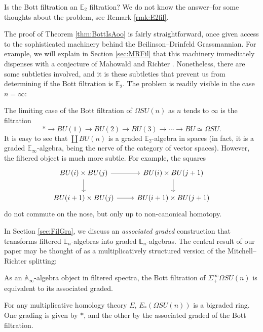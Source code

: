 \begin{qst} \label{qst:BottE2}
Is the Bott filtration an $\mathbb{E}_2$ filtration?  We do not know the answer--for some thoughts about the problem, see Remark \ref{rmk:E2fil}.
\end{qst}

The proof of Theorem \ref{thm:BottIsAoo} is fairly straightforward, once given access to the sophisticated machinery behind the Beilinson--Drinfeld Grassmannian.  For example, we will explain in Section \ref{sec:MRFil} that this machinery immediately dispenses with a conjecture of Mahowald and Richter \cite{MahowaldRichter}.  Nonetheless, there are some subtleties involved, and it is these subtleties that prevent us from determining if the Bott filtration is $\mathbb{E}_2$.  The problem is readily visible in the case $n=\infty$:

\begin{exm}\label{exm:BottFil}
The limiting case of the Bott filtration of $\Omega SU(n)$ as $n$ tends to $\infty$ is the filtration
$$* \longrightarrow BU(1) \longrightarrow BU(2) \longrightarrow BU(3) \longrightarrow \cdots \longrightarrow BU \simeq \Omega SU.$$
It is easy to see that $\coprod BU(n)$ is a graded $\mathbb{E}_2$-algebra in spaces (in fact, it is a graded $\mathbb{E}_\infty$-algebra, being the nerve of the category of vector spaces).  However, the filtered object is much more subtle.  For example, the squares
$$
\begin{tikzcd}
BU(i) \times BU(j) \arrow{d} \arrow{r} & BU(i) \times BU(j+1) \arrow{d} \\
BU(i+1) \times BU(j) \arrow{r} & BU(i+1) \times BU(j+1)
\end{tikzcd}
$$
do not commute on the nose, but only up to non-canonical homotopy.
\end{exm}

In Section \ref{sec:FilGra}, we discuss an \textit{associated graded} construction that transforms filtered $\mathbb{E}_n$-algebras into graded $\mathbb{E}_n$-algebras.  The central result of our paper may be thought of as a multiplicatively structured version of the Mitchell--Richter splitting:

\begin{thm} \label{thm:MainAoo}
As an $\mathbb{A}_\infty$-algebra object in filtered spectra, the Bott filtration of $\Sigma^{\infty}_+ \Omega SU(n)$ is equivalent to its associated graded.
\end{thm}

\begin{cor}
For any multiplicative homology theory $E$, $E_*(\Omega SU(n))$ is a bigraded ring.  One grading is given by $*$, and the other by the associated graded of the Bott filtration.
\end{cor}

